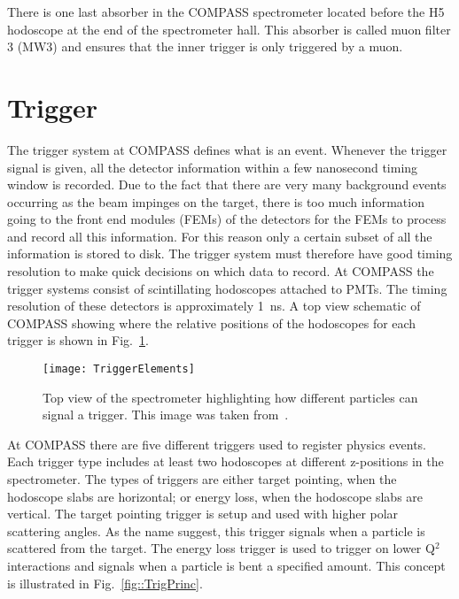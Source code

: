 There is one last absorber in the COMPASS spectrometer located before the H5
hodoscope at the end of the spectrometer hall.  This absorber is called muon
filter 3 (MW3) and ensures that the inner trigger is only triggered by a
muon. \par


\section{Trigger} \label{sec::trigger}
The trigger system at COMPASS defines what is an event.  Whenever the trigger
signal is given, all the detector information within a few nanosecond timing
window is recorded.  Due to the fact that there are very many background events
occurring as the beam impinges on the target, there is too much information
going to the front end modules (FEMs) of the detectors for the FEMs to process
and record all this information.  For this reason only a certain subset of all
the information is stored to disk.  The trigger system must therefore have good
timing resolution to make quick decisions on which data to record.  At COMPASS
the trigger systems consist of scintillating hodoscopes attached to PMTs.  The
timing resolution of these detectors is approximately 1~ns.  A top view
schematic of COMPASS showing where the relative positions of the hodoscopes for
each trigger is shown in Fig.~\ref{fig::TriggerElements}.  \par

\begin{figure}[h!t]
  \centering
  \texttt{[image: TriggerElements]}
  \caption{Top view of the spectrometer highlighting how different particles can
    signal a trigger.  This image was taken from~\cite{BERNET2005217}.}
  \label{fig::TriggerElements}
\end{figure}

At COMPASS there are five different triggers used to register physics events.
Each trigger type includes at least two hodoscopes at different z-positions in
the spectrometer.  The types of triggers are either target pointing, when the
hodoscope slabs are horizontal; or energy loss, when the hodoscope slabs are
vertical.  The target pointing trigger is setup and used with higher polar
scattering angles.  As the name suggest, this trigger signals when a particle is
scattered from the target.  The energy loss trigger is used to trigger on lower
Q$^2$ interactions and signals when a particle is bent a specified amount.
This concept is illustrated in Fig.~\ref{fig::TrigPrinc}.  \par

